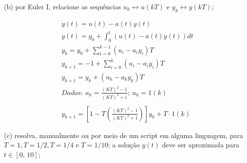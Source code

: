 \documentclass[10pt]{article}
\begin{document}
(b) por Euler I, relacione as sequências $u_k \leftrightarrow u(kT)$ e $y_k \leftrightarrow y(kT)$;

\begin{align*}
    \dot{y}(t) = u(t) - a(t)y(t)\\
    y(t) = y_{0} + \int_{0}^{t} (u(t) - a(t)y(t))dt\\
    y_k = y_0 + \sum_{i=0}^{k-1} (u_i - a_i y_i)T\\
    y_{k+1} = -1 + \sum_{i=0}^{k} (u_i - a_i y_i)T\\
    y_{k+1} = y_k + (u_k - a_k y_k)T\\
    Dados:\ a_k = \frac{(KT)^2-1}{(KT)^2+1};\ u_k = 1(k)\\ \\
    y_{k+1} = \left[ 1 - T \left( \frac{(KT)^2-1}{(KT)^2+1} \right) \right] y_k + T \cdot 1(k)
\end{align*}

(c) resolva, manualmente ou por meio de um script em alguma linguagem, para $T = 1, T = 1/2, T = 1/4$ e $T = 1/10$; a solução $y(t)$ deve ser aproximada para $t \in [0, \, 10]$;
\end{document}
